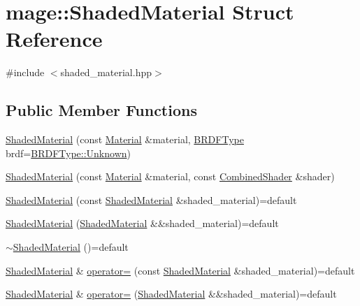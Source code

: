 \hypertarget{structmage_1_1_shaded_material}{}\section{mage\+:\+:Shaded\+Material Struct Reference}
\label{structmage_1_1_shaded_material}


{\ttfamily \#include $<$shaded\+\_\+material.\+hpp$>$}

\subsection*{Public Member Functions}
\begin{DoxyCompactItemize}
\item 
\hyperlink{structmage_1_1_shaded_material_a3b00f6ba8fc8a47e188b6adf28cc3460}{Shaded\+Material} (const \hyperlink{structmage_1_1_material}{Material} \&material, \hyperlink{namespacemage_ae7a7a03a7b34d7e2689689bb8295cd38}{B\+R\+D\+F\+Type} brdf=\hyperlink{namespacemage_ae7a7a03a7b34d7e2689689bb8295cd38a88183b946cc5f0e8c96b2e66e1c74a7e}{B\+R\+D\+F\+Type\+::\+Unknown})
\item 
\hyperlink{structmage_1_1_shaded_material_a09f840f8053ae09a1db807c497607dd3}{Shaded\+Material} (const \hyperlink{structmage_1_1_material}{Material} \&material, const \hyperlink{structmage_1_1_combined_shader}{Combined\+Shader} \&shader)
\item 
\hyperlink{structmage_1_1_shaded_material_a8bd45b489933e89f0a16f79e29161c27}{Shaded\+Material} (const \hyperlink{structmage_1_1_shaded_material}{Shaded\+Material} \&shaded\+\_\+material)=default
\item 
\hyperlink{structmage_1_1_shaded_material_acd222233b31513b095e26aa6e38c4a99}{Shaded\+Material} (\hyperlink{structmage_1_1_shaded_material}{Shaded\+Material} \&\&shaded\+\_\+material)=default
\item 
\hyperlink{structmage_1_1_shaded_material_ac7be54322faed90a07b26225e270e571}{$\sim$\+Shaded\+Material} ()=default
\item 
\hyperlink{structmage_1_1_shaded_material}{Shaded\+Material} \& \hyperlink{structmage_1_1_shaded_material_ade9ec3ee6aae198e695240a5b89a0d72}{operator=} (const \hyperlink{structmage_1_1_shaded_material}{Shaded\+Material} \&shaded\+\_\+material)=default
\item 
\hyperlink{structmage_1_1_shaded_material}{Shaded\+Material} \& \hyperlink{structmage_1_1_shaded_material_a29fb482ab140fcb47709ffda03a67714}{operator=} (\hyperlink{structmage_1_1_shaded_material}{Shaded\+Material} \&\&shaded\+\_\+material)=default

\end{DoxyCompactItemize}
